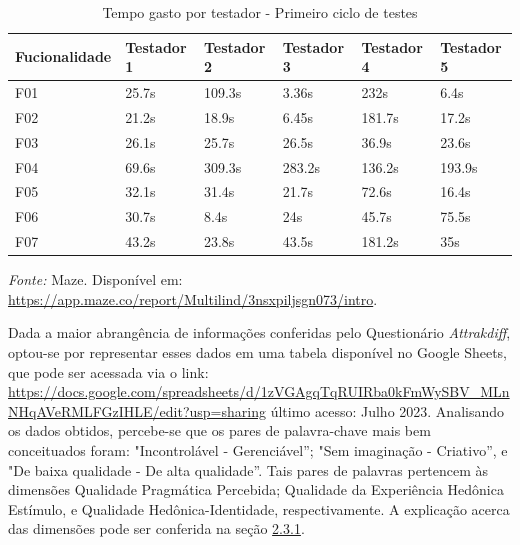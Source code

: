 \begin{table}[h!]
	\centering
	\caption{Tempo gasto por testador - Primeiro ciclo de testes}
	\label{tab06}
	\begin{adjustbox}{center}
	\begin{tabular}{l|l|l|l|l|l}
	\hline
	Fucionalidade & Testador 1 & Testador 2 & Testador 3 & Testador 4 & Testador 5 \\ 	\hline
	F01                   & 25.7s     & 109.3s     & 3.36s      & 232s       & 6.4s      \\
	F02                   & 21.2s        & 18.9s      & 6.45s      & 181.7s    & 17.2s     \\
	F03                   & 26.1s        & 25.7s      & 26.5s      & 36.9s     & 23.6s     \\
	F04                   & 69.6s        & 309.3s     & 283.2s     & 136.2s     & 193.9s     \\
	F05                   & 32.1s      & 31.4s      & 21.7s     & 72.6s     & 16.4s     \\
	F06                   & 30.7s     & 8.4s      & 24s     & 45.7s     & 75.5s     \\
	F07                   & 43.2s     & 23.8s      & 43.5s     & 181.2s    & 35s      \\ 	\hline
	\end{tabular}
	\end{adjustbox}
	\begin{tablenotes}[flushleft]
		\centering
		\item \textit{Fonte:} Maze. Disponível em: \url{https://app.maze.co/report/Multilind/3nsxpiljsgn073/intro}.
	  \end{tablenotes}
\end{table}


Dada a maior abrangência de informações conferidas pelo Questionário \textit{Attrakdiff}, optou-se por representar esses dados em uma tabela disponível no Google Sheets, que pode ser acessada via o link: 
\url{https://docs.google.com/spreadsheets/d/1zVGAgqTqRUIRba0kFmWySBV_MLnNHqAVeRMLFGzIHLE/edit?usp=sharing} último acesso: Julho 2023. Analisando os dados obtidos, percebe-se que os pares de palavra-chave 
mais bem conceituados foram: "Incontrolável - Gerenciável''; "Sem imaginação - Criativo'', e "De baixa qualidade - De alta qualidade''. Tais pares de palavras pertencem às dimensões Qualidade Pragmática Percebida;
Qualidade da Experiência Hedônica Estímulo, e Qualidade Hedônica-Identidade, respectivamente. A explicação acerca das dimensões pode ser conferida na seção \hyperref[sec:Medicao2]{2.3.1}. 

